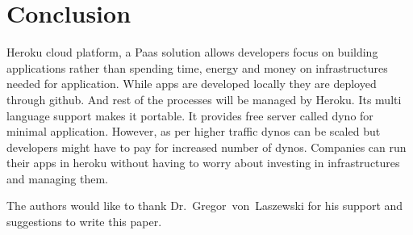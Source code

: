 \section{Conclusion}

 Heroku cloud platform, a Paas solution allows developers focus on building 
 applications rather than spending time, energy and money on infrastructures
 needed for application. While apps are developed locally they are deployed
 through github. And rest of the processes will be managed by Heroku. Its
 multi language support makes it portable. It provides free server called dyno
 for minimal application. However, as per higher traffic dynos can be scaled but
 developers might have to pay for increased number of dynos. Companies can run
 their apps in heroku without having to worry about investing in infrastructures
 and managing them.


\begin{acks}

  The authors would like to thank Dr.~Gregor~von~Laszewski for his
  support and suggestions to write this paper.

\end{acks}


 

